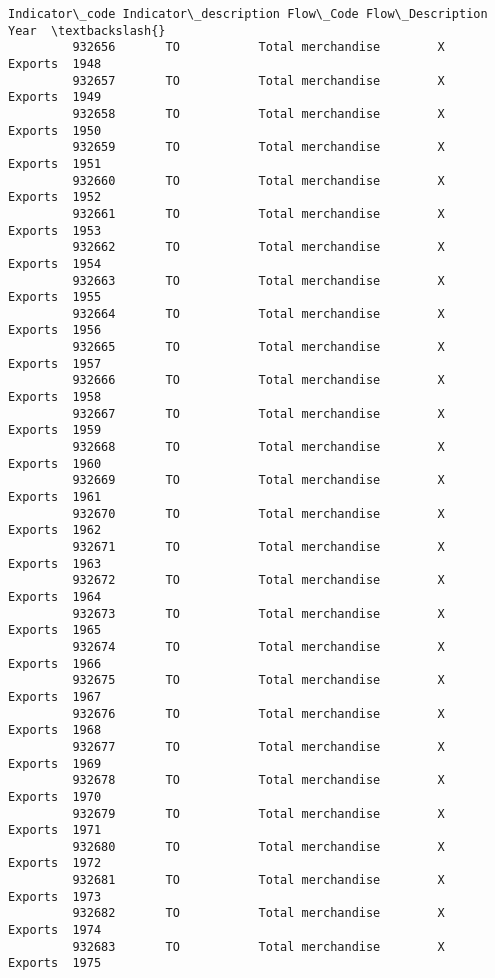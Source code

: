 \documentclass[11pt]{article}
\begin{document}
\begin{Verbatim}[commandchars=\\\{\}]
                Indicator\_code Indicator\_description Flow\_Code Flow\_Description  Year  \textbackslash{}
         932656       TO           Total merchandise        X           Exports  1948   
         932657       TO           Total merchandise        X           Exports  1949   
         932658       TO           Total merchandise        X           Exports  1950   
         932659       TO           Total merchandise        X           Exports  1951   
         932660       TO           Total merchandise        X           Exports  1952   
         932661       TO           Total merchandise        X           Exports  1953   
         932662       TO           Total merchandise        X           Exports  1954   
         932663       TO           Total merchandise        X           Exports  1955   
         932664       TO           Total merchandise        X           Exports  1956   
         932665       TO           Total merchandise        X           Exports  1957   
         932666       TO           Total merchandise        X           Exports  1958   
         932667       TO           Total merchandise        X           Exports  1959   
         932668       TO           Total merchandise        X           Exports  1960   
         932669       TO           Total merchandise        X           Exports  1961   
         932670       TO           Total merchandise        X           Exports  1962   
         932671       TO           Total merchandise        X           Exports  1963   
         932672       TO           Total merchandise        X           Exports  1964   
         932673       TO           Total merchandise        X           Exports  1965   
         932674       TO           Total merchandise        X           Exports  1966   
         932675       TO           Total merchandise        X           Exports  1967   
         932676       TO           Total merchandise        X           Exports  1968   
         932677       TO           Total merchandise        X           Exports  1969   
         932678       TO           Total merchandise        X           Exports  1970   
         932679       TO           Total merchandise        X           Exports  1971   
         932680       TO           Total merchandise        X           Exports  1972   
         932681       TO           Total merchandise        X           Exports  1973   
         932682       TO           Total merchandise        X           Exports  1974   
         932683       TO           Total merchandise        X           Exports  1975   

\end{Verbatim}
\end{document}

